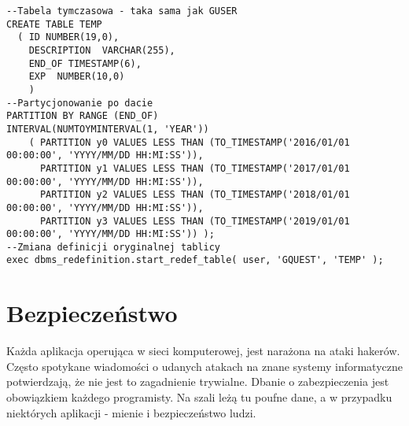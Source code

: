 \documentclass[a4paper,12pt,twoside,openany]{report}
\begin{document}
\begin{lstlisting}
--Tabela tymczasowa - taka sama jak GUSER
CREATE TABLE TEMP
  ( ID NUMBER(19,0),
    DESCRIPTION  VARCHAR(255),
    END_OF TIMESTAMP(6),
    EXP  NUMBER(10,0)
    )
--Partycjonowanie po dacie
PARTITION BY RANGE (END_OF) 
INTERVAL(NUMTOYMINTERVAL(1, 'YEAR'))
    ( PARTITION y0 VALUES LESS THAN (TO_TIMESTAMP('2016/01/01 00:00:00', 'YYYY/MM/DD HH:MI:SS')),
      PARTITION y1 VALUES LESS THAN (TO_TIMESTAMP('2017/01/01 00:00:00', 'YYYY/MM/DD HH:MI:SS')),
      PARTITION y2 VALUES LESS THAN (TO_TIMESTAMP('2018/01/01 00:00:00', 'YYYY/MM/DD HH:MI:SS')),
      PARTITION y3 VALUES LESS THAN (TO_TIMESTAMP('2019/01/01 00:00:00', 'YYYY/MM/DD HH:MI:SS')) );
--Zmiana definicji oryginalnej tablicy    
exec dbms_redefinition.start_redef_table( user, 'GQUEST', 'TEMP' );
\end{lstlisting}
\chapter{Bezpieczeństwo}
\label{Safety}
Każda aplikacja operująca w sieci komputerowej, jest narażona na ataki hakerów. Często spotykane wiadomości o udanych atakach na znane systemy informatyczne potwierdzają, że nie jest to zagadnienie trywialne. Dbanie o zabezpieczenia jest obowiązkiem każdego programisty. Na szali leżą tu poufne dane, a w przypadku niektórych aplikacji - mienie i bezpieczeństwo ludzi.
\end{document}
